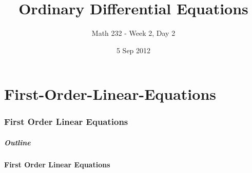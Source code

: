 \part{First-Order-Linear-Equations}
\section{First Order Linear Equations}

\title{Ordinary Differential Equations}
\subtitle{Math 232 - Week 2, Day 2}
\date{5 Sep 2012}

\begin{frame}
  \titlepage
\end{frame}

\begin{frame}
  \frametitle{Outline}
\end{frame}


\subsection{First Order Linear Equations}

